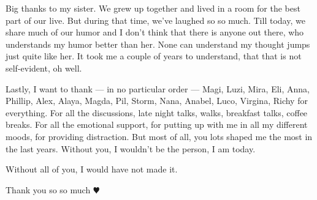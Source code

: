 Big thanks to my sister. We grew up together and lived in a room for the best part of our live. But
during that time, we've laughed so so much. Till today, we share much of our humor and I don't think
that there is anyone out there, who understands my humor better than her. None can understand my
thought jumps just quite like her. It took me a couple of years to understand, that that is not
self-evident, oh well.

Lastly, I want to thank --- in no particular order --- Magi, Luzi, Mira, Eli, Anna, Phillip, Alex,
Alaya, Magda, Pil, Storm, Nana, Anabel, Luco, Virgina, Richy for everything. For all the
discussions, late night talks, walks, breakfast talks, coffee breaks. For all the emotional support,
for putting up with me in all my different moods, for providing distraction. But most of all, you
lots shaped me the most in the last years. Without you, I wouldn't be the person, I am today.

Without all of you, I would have not made it.

\begin{flushright}
    Thank you so so much \(\varheartsuit\)
\end{flushright}
